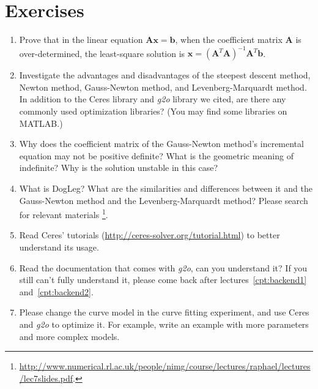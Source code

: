 \section*{Exercises}
\begin{enumerate}
    \item Prove that in the linear equation $\mathbf{A} \mathbf{x} = \mathbf{b}$, when the coefficient matrix $\mathbf{A}$ is over-determined, the least-square solution is $\mathbf{x} = (\mathbf{A}^T\mathbf{A})^{-1}\mathbf{A}^T \mathbf{b}$.
    \item Investigate the advantages and disadvantages of the steepest descent method, Newton method, Gauss-Newton method, and Levenberg-Marquardt method. In addition to the Ceres library and \textit{g2o} library we cited, are there any commonly used optimization libraries? (You may find some libraries on MATLAB.)
    \item Why does the coefficient matrix of the Gauss-Newton method's incremental equation may not be positive definite? What is the geometric meaning of indefinite? Why is the solution unstable in this case?
    \item What is DogLeg? What are the similarities and differences between it and the Gauss-Newton method and the Levenberg-Marquardt method? Please search for relevant materials \footnote{\url{http://www.numerical.rl.ac.uk/people/nimg/course/lectures/raphael/lectures/lec7slides.pdf}. }.
    \item Read Ceres' tutorials (\url{http://ceres-solver.org/tutorial.html}) to better understand its usage.
    \item Read the documentation that comes with \textit{g2o}, can you understand it? If you still can't fully understand it, please come back after lectures~\ref{cpt:backend1} and~\ref{cpt:backend2}.
    \item[\optional] Please change the curve model in the curve fitting experiment, and use Ceres and \textit{g2o} to optimize it. For example, write an example with more parameters and more complex models.
\end{enumerate}
